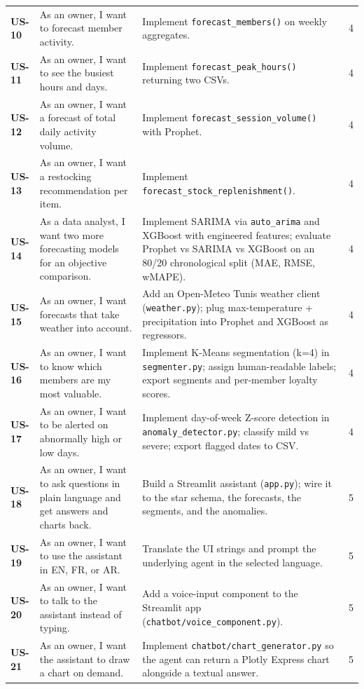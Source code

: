 \documentclass[12pt, a4paper]{report}
\begin{document}
\begin{longtable}{>{\bfseries}p{1.3cm} p{4.6cm} p{6.6cm} c}
  US-10 & As an owner, I want to forecast member activity.
        & Implement \texttt{forecast\_members()} on weekly aggregates.
        & 4 \\[3pt]
  US-11 & As an owner, I want to see the busiest hours and days.
        & Implement \texttt{forecast\_peak\_hours()} returning two CSVs.
        & 4 \\[3pt]
  US-12 & As an owner, I want a forecast of total daily activity volume.
        & Implement \texttt{forecast\_session\_volume()} with Prophet.
        & 4 \\[3pt]
  US-13 & As an owner, I want a restocking recommendation per item.
        & Implement \texttt{forecast\_stock\_replenishment()}.
        & 4 \\[3pt]
  US-14 & As a data analyst, I want two more forecasting models for an
          objective comparison.
        & Implement SARIMA via \texttt{auto\_arima} and XGBoost with engineered
          features; evaluate Prophet vs SARIMA vs XGBoost on an 80/20
          chronological split (MAE, RMSE, wMAPE).
        & 4 \\[3pt]
  US-15 & As an owner, I want forecasts that take weather into account.
        & Add an Open-Meteo Tunis weather client (\texttt{weather.py});
          plug max-temperature + precipitation into Prophet and XGBoost as
          regressors.
        & 4 \\[3pt]
  US-16 & As an owner, I want to know which members are my most valuable.
        & Implement K-Means segmentation (k=4) in \texttt{segmenter.py};
          assign human-readable labels; export segments and per-member
          loyalty scores.
        & 4 \\[3pt]
  US-17 & As an owner, I want to be alerted on abnormally high or low days.
        & Implement day-of-week Z-score detection in
          \texttt{anomaly\_detector.py}; classify mild vs severe; export
          flagged dates to CSV.
        & 4 \\[3pt]
  US-18 & As an owner, I want to ask questions in plain language and get
          answers and charts back.
        & Build a Streamlit assistant (\texttt{app.py}); wire it to the
          star schema, the forecasts, the segments, and the anomalies.
        & 5 \\[3pt]
  US-19 & As an owner, I want to use the assistant in EN, FR, or AR.
        & Translate the UI strings and prompt the underlying agent in the
          selected language.
        & 5 \\[3pt]
  US-20 & As an owner, I want to talk to the assistant instead of typing.
        & Add a voice-input component to the Streamlit app
          (\texttt{chatbot/voice\_component.py}).
        & 5 \\[3pt]
  US-21 & As an owner, I want the assistant to draw a chart on demand.
        & Implement \texttt{chatbot/chart\_generator.py} so the agent can
          return a Plotly Express chart alongside a textual answer.
        & 5 \\
\end{longtable}
\end{document}
